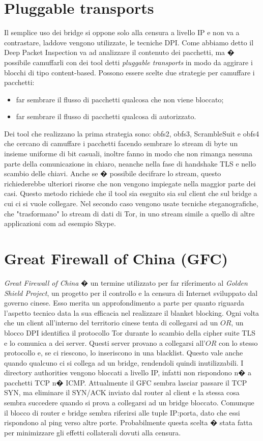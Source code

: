 \section{Pluggable transports}
Il semplice uso dei bridge si oppone solo alla censura a livello IP e non va a contrastare, laddove vengono utilizzate, le tecniche DPI. Come abbiamo detto il Deep Packet Inspection va ad analizzare il contenuto dei pacchetti, ma � possibile camuffarli con dei tool detti \emph{pluggable transports}  in modo da aggirare i blocchi di tipo content-based.
Possono essere scelte due strategie per camuffare i pacchetti:
\begin{itemize}
\item far sembrare il flusso di pacchetti qualcosa che non viene bloccato;
\item far sembrare il flusso di pacchetti qualcosa di autorizzato.
\end{itemize}
Dei tool che realizzano la prima strategia sono: obfs2, obfs3, ScrambleSuit e obfs4 che cercano di camuffare i pacchetti facendo sembrare lo stream di byte un insieme uniforme di bit casuali, inoltre fanno in modo che non rimanga nessuna parte della comunicazione in chiaro, neanche nella fase di handshake TLS e nello scambio delle chiavi. Anche se � possibile decifrare lo stream, questo richiederebbe ulteriori risorse che non vengono impiegate nella maggior parte dei casi. Questo metodo richiede che il tool sia eseguito sia sul client che sul bridge a cui ci si vuole collegare.
Nel secondo caso vengono usate tecniche steganografiche, che "trasformano" lo stream di dati di Tor, in uno stream simile a quello di altre applicazioni com ad esempio Skype.  

\section{Great Firewall of China (GFC)}
\emph{Great Firewall of China} � un termine utilizzato per far riferimento al \emph{Golden Shield Project}, un progetto per il controllo e la censura di Internet sviluppato dal governo cinese. Esso merita un approfondimento a parte per quanto riguarda l'aspetto tecnico data la sua efficacia nel realizzare il blanket blocking. Ogni volta che un client all'interno del territorio cinese tenta di collegarsi ad un $OR$, un blocco DPI identifica il protocollo Tor durante lo scambio della cipher suite TLS e lo comunica a dei server. Questi server provano a collegarsi all'$OR$ con lo stesso protocollo e, se ci riescono, lo inseriscono in una blacklist. Questo vale anche quando qualcuno ci si collega ad un bridge, rendendoli quindi inutilizzabili. I directory authorities vengono bloccati a livello IP, infatti non rispondono n� a pacchetti TCP n� ICMP. Attualmente il GFC sembra lasciar passare il TCP SYN, ma eliminare il SYN/ACK inviato dal router al client e la stessa cosa sembra succedere quando si prova a collegarsi ad un bridge bloccato. Comunque il blocco di router e bridge sembra riferirsi alle tuple IP:porta, dato che essi rispondono al ping verso altre porte. Probabilmente questa scelta � stata fatta per minimizzare gli effetti collaterali dovuti alla censura.

